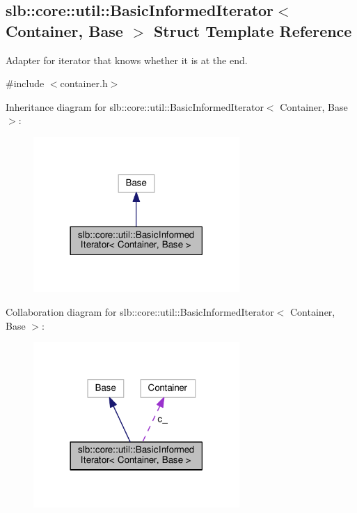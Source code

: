 \hypertarget{structslb_1_1core_1_1util_1_1BasicInformedIterator}{}\subsection{slb\+:\+:core\+:\+:util\+:\+:Basic\+Informed\+Iterator$<$ Container, Base $>$ Struct Template Reference}
\label{structslb_1_1core_1_1util_1_1BasicInformedIterator}


Adapter for iterator that knows whether it is at the end.  




{\ttfamily \#include $<$container.\+h$>$}



Inheritance diagram for slb\+:\+:core\+:\+:util\+:\+:Basic\+Informed\+Iterator$<$ Container, Base $>$\+:\nopagebreak
\begin{figure}[H]
\begin{center}
\leavevmode
\includegraphics[width=222pt]{structslb_1_1core_1_1util_1_1BasicInformedIterator__inherit__graph}
\end{center}
\end{figure}


Collaboration diagram for slb\+:\+:core\+:\+:util\+:\+:Basic\+Informed\+Iterator$<$ Container, Base $>$\+:\nopagebreak
\begin{figure}[H]
\begin{center}
\leavevmode
\includegraphics[width=222pt]{structslb_1_1core_1_1util_1_1BasicInformedIterator__coll__graph}
\end{center}
\end{figure}
